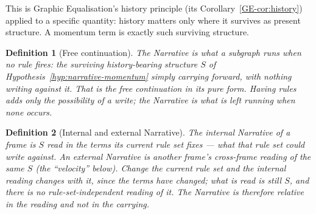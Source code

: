 \documentclass[11pt,a4paper]{article}
\newtheorem{definition}{Definition}[section]
\theoremstyle{remark}
\begin{document}
This is Graphic Equalisation's history principle (its Corollary~\ref{GE-cor:history}) applied to a specific quantity: history matters only where it survives as present structure. A momentum term is exactly such surviving structure.

\begin{definition}[Free continuation]\label{def:free-continuation}
The Narrative is what a subgraph runs when \emph{no rule fires}: the surviving
history-bearing structure $S$ of Hypothesis~\ref{hyp:narrative-momentum} simply
carrying forward, with nothing writing against it. That is the free continuation
in its pure form. Having rules adds only the \emph{possibility} of a write; the
Narrative is what is left running when none occurs.
\end{definition}

\begin{definition}[Internal and external Narrative]\label{def:internal-external}
The \emph{internal} Narrative of a frame is $S$ read in the terms its current
rule set fixes --- what that rule set could write against. An \emph{external}
Narrative is another frame's cross-frame reading of the same $S$ (the
``velocity'' below). Change the current rule set and the internal reading changes
with it, since the terms have changed; what is read is still $S$, and there is no
rule-set-independent \emph{reading} of it. The Narrative is therefore relative in
the reading and not in the carrying.
\end{definition}
\end{document}
